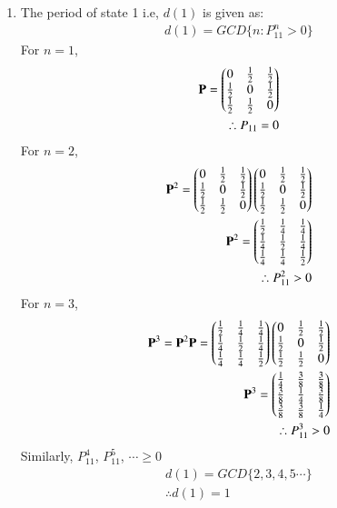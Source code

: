 \documentclass[journal,12pt,twocolumn]{IEEEtran}
\begin{document}
    \begin{enumerate}
    \item{ The period of state 1 i.e, $d(1)$ is given as:
    \begin{align}
    d(1)=GCD\{n : P_{11}^n > 0\} \label{eq1a}
    \end{align}
     For $n=1$,
    \begin{align}
    \mathbf{P}=\begin{pmatrix}0&\frac{1}{2}&\frac{1}{2}\\\frac{1}{2}&0&\frac{1}{2}\\\frac{1}{2}&\frac{1}{2}&0\end{pmatrix}\\
    \therefore P_{11} = 0
    \end{align}
    For $n=2$,
    \begin{align}
    \mathbf{P}^2=\begin{pmatrix}0&\frac{1}{2}&\frac{1}{2}\\\frac{1}{2}&0&\frac{1}{2}\\\frac{1}{2}&\frac{1}{2}&0\end{pmatrix}\begin{pmatrix}0&\frac{1}{2}&\frac{1}{2}\\\frac{1}{2}&0&\frac{1}{2}\\\frac{1}{2}&\frac{1}{2}&0\end{pmatrix}\\
    \mathbf{P}^2=\begin{pmatrix}\frac{1}{2}&\frac{1}{4}&\frac{1}{4}\\\frac{1}{4}&\frac{1}{2}&\frac{1}{4}\\\frac{1}{4}&\frac{1}{4}&\frac{1}{2}\end{pmatrix}\\
    \therefore P_{11}^2 > 0
    \end{align}
    For $n=3$,
    \begin{align}
    \mathbf{P}^3=\mathbf{P}^2\mathbf{P}=\begin{pmatrix}\frac{1}{2}&\frac{1}{4}&\frac{1}{4}\\\frac{1}{4}&\frac{1}{2}&\frac{1}{4}\\\frac{1}{4}&\frac{1}{4}&\frac{1}{2}\end{pmatrix}\begin{pmatrix}0&\frac{1}{2}&\frac{1}{2}\\\frac{1}{2}&0&\frac{1}{2}\\\frac{1}{2}&\frac{1}{2}&0\end{pmatrix}\\
    \mathbf{P}^3=\begin{pmatrix}\frac{1}{4}&\frac{3}{8}&\frac{3}{8}\\\frac{3}{8}&\frac{1}{4}&\frac{3}{8}\\\frac{3}{8}&\frac{3}{8}&\frac{1}{4}\end{pmatrix}\\
    \therefore P_{11}^3 > 0
    \end{align}
    Similarly, $P_{11}^4$, $P_{11}^5$, $\cdots \geq 0$ 
    \begin{align}
    d(1)=GCD\{2,3,4,5\cdots\}\\
    \therefore d(1)=1 \label{eq1}
    \end{align}
}
\end{enumerate}
\end{document}

